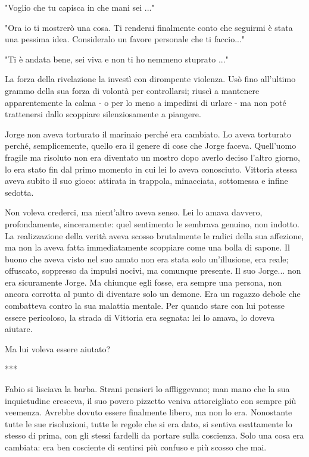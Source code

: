 "Voglio che tu capisca in che mani sei ..."

"Ora io ti mostrerò una cosa. Ti renderai finalmente conto che seguirmi è stata una pessima idea. Consideralo un favore personale che ti faccio..."

"Ti è andata bene, sei viva e non ti ho nemmeno stuprato ..."

La forza della rivelazione la investì con dirompente violenza. Usò fino all'ultimo grammo della sua forza di volontà per controllarsi; riuscì a mantenere apparentemente la calma - o per lo meno a impedirsi di urlare - ma non poté trattenersi dallo scoppiare silenziosamente a piangere.

Jorge non aveva torturato il marinaio perché era cambiato. Lo aveva torturato perché, semplicemente, quello era il genere di cose che Jorge faceva. Quell'uomo fragile ma risoluto non era diventato un mostro dopo averlo deciso l'altro giorno, lo era stato fin dal primo momento in cui lei lo aveva conosciuto. Vittoria stessa aveva subito il suo gioco: attirata in trappola, minacciata, sottomessa e infine sedotta.

Non voleva crederci, ma nient'altro aveva senso. Lei lo amava davvero, profondamente, sinceramente: quel sentimento le sembrava genuino, non indotto. La realizzazione della verità aveva scosso brutalmente le radici della sua affezione, ma non la aveva fatta immediatamente scoppiare come una bolla di sapone. Il buono che aveva visto nel suo amato non era stata solo un'illusione, era reale; offuscato, soppresso da impulsi nocivi, ma comunque presente. Il suo Jorge... non era sicuramente Jorge. Ma chiunque egli fosse, era sempre una persona, non ancora corrotta al punto di diventare solo un demone. Era un ragazzo debole che combatteva contro la sua malattia mentale. Per quando stare con lui potesse essere pericoloso, la strada di Vittoria era segnata: lei lo amava, lo doveva aiutare.

Ma lui voleva essere aiutato?

***

Fabio si lisciava la barba. Strani pensieri lo affliggevano; man mano che la sua inquietudine cresceva, il suo povero pizzetto veniva attorcigliato con sempre più veemenza. Avrebbe dovuto essere finalmente libero, ma non lo era. Nonostante tutte le sue risoluzioni, tutte le regole che si era dato, si sentiva esattamente lo stesso di prima, con gli stessi fardelli da portare sulla coscienza. Solo una cosa era cambiata: era ben cosciente di sentirsi più confuso e più scosso che mai.

